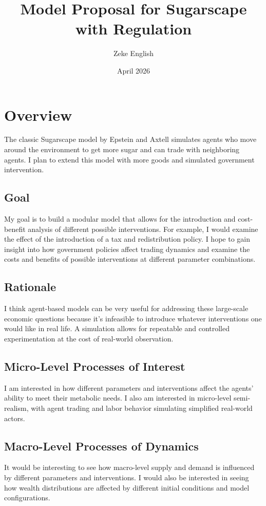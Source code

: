 \documentclass{article}
\title{Model Proposal for Sugarscape with Regulation}
\author{Zeke English}
\date{April 2026}
\begin{document}
\maketitle

\section{Overview}
The classic Sugarscape model by Epstein and Axtell \cite{Epstein_Axtell} simulates agents who move around the environment to get more sugar and can trade with neighboring agents. I plan to extend this model with more goods and simulated government intervention.


\subsection{Goal}
My goal is to build a modular model that allows for the introduction and cost-benefit analysis of different possible interventions. For example, I would examine the effect of the introduction of a tax and redistribution policy. I hope to gain insight into how government policies affect trading dynamics and examine the costs and benefits of possible interventions at different parameter combinations. 

\subsection{Rationale}
I think agent-based models can be very useful for addressing these large-scale economic questions because it's infeasible to introduce whatever interventions one would like in real life. A simulation allows for repeatable and controlled experimentation at the cost of real-world observation.

\subsection{Micro-Level Processes of Interest}
I am interested in how different parameters and interventions affect the agents' ability to meet their metabolic needs. I also am interested in micro-level semi-realism, with agent trading and labor behavior simulating simplified real-world actors. 


\subsection{Macro-Level Processes of Dynamics}
It would be interesting to see how macro-level supply and demand is influenced by different parameters and interventions. I would also be interested in seeing how wealth distributions are affected by different initial conditions and model configurations.
\end{document}
